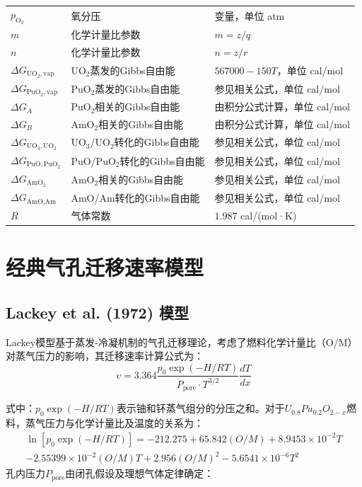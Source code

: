 \begin{xltabular}{\textwidth}{>{\centering\arraybackslash{}\hsize}X 
		>{\RaggedRight\arraybackslash{}\hsize}X 
		>{\centering\arraybackslash{}\hsize}X}
	$p_{\text{O}_2}$ & 氧分压 & 变量，单位 atm \\
	$m$ & 化学计量比参数 & $m = z/q$ \\
	$n$ & 化学计量比参数 & $n = z/r$ \\
	$\Delta G_{\text{UO}_2,\text{vap}}$ & UO$_2$蒸发的Gibbs自由能 & $567000 - 150T$，单位 cal/mol \\
	$\Delta G_{\text{PuO}_2,\text{vap}}$ & PuO$_2$蒸发的Gibbs自由能 & 参见相关公式，单位 cal/mol \\
	$\Delta G_A$ & PuO$_2$相关的Gibbs自由能 & 由积分公式计算，单位 cal/mol \\
	$\Delta G_B$ & AmO$_2$相关的Gibbs自由能 & 由积分公式计算，单位 cal/mol \\
	$\Delta G_{\text{UO}_3,\text{UO}_2}$ & UO$_3$/UO$_2$转化的Gibbs自由能 & 参见相关公式，单位 cal/mol \\
	$\Delta G_{\text{PuO},\text{PuO}_2}$ & PuO/PuO$_2$转化的Gibbs自由能 & 参见相关公式，单位 cal/mol \\
	$\Delta G_{\text{AmO}_2}$ & AmO$_2$相关的Gibbs自由能 & 参见相关公式，单位 cal/mol \\
	$\Delta G_{\text{AmO},\text{Am}}$ & AmO/Am转化的Gibbs自由能 & 参见相关公式，单位 cal/mol \\
	$R$ & 气体常数 & $1.987$ cal/(mol·K) \\
\end{xltabular}


\section{经典气孔迁移速率模型}

\subsection{Lackey et al. (1972) 模型}

Lackey模型基于蒸发-冷凝机制的气孔迁移理论，考虑了燃料化学计量比（O/M）对蒸气压力的影响，其迁移速率计算公式为：
\begin{equation}
	v = 3.364 \frac{p_0 \exp(-H/RT)}{P_{\text{pore}} \cdot T^{3/2}} \frac{dT}{dx}
	\label{eq:app_b_lackey_migration_velocity}
\end{equation}

\noindent 式中：$p_0 \exp(-H/RT)$表示铀和钚蒸气组分的分压之和。对于$U_{0.8}Pu_{0.2}O_{2-x}$燃料，蒸气压力与化学计量比及温度的关系为：
\begin{equation}
	\begin{gathered}
		\ln[p_0 \exp(-H/RT)] =  -212.275 + 65.842(O/M) + 8.9453 \times 10^{-2}T \\
		- 2.55399 \times 10^{-2}(O/M)T + 2.956(O/M)^2 - 5.6541 \times 10^{-6}T^2
	\end{gathered}
	\label{eq:app_b_lackey_vapor_pressure_fit}
\end{equation}
孔内压力$P_{\text{pore}}$由闭孔假设及理想气体定律确定：

